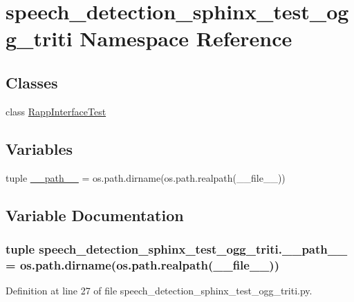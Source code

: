 \hypertarget{namespacespeech__detection__sphinx__test__ogg__triti}{\section{speech\-\_\-detection\-\_\-sphinx\-\_\-test\-\_\-ogg\-\_\-triti Namespace Reference}
\label{namespacespeech__detection__sphinx__test__ogg__triti}
}
\subsection*{Classes}
\begin{DoxyCompactItemize}
\item 
class \hyperlink{classspeech__detection__sphinx__test__ogg__triti_1_1RappInterfaceTest}{Rapp\-Interface\-Test}
\end{DoxyCompactItemize}
\subsection*{Variables}
\begin{DoxyCompactItemize}
\item 
tuple \hyperlink{namespacespeech__detection__sphinx__test__ogg__triti_a83b70617e4509ec3cfdce7b2b2aec51f}{\-\_\-\-\_\-path\-\_\-\-\_\-} = os.\-path.\-dirname(os.\-path.\-realpath(\-\_\-\-\_\-file\-\_\-\-\_\-))
\end{DoxyCompactItemize}


\subsection{Variable Documentation}
\hypertarget{namespacespeech__detection__sphinx__test__ogg__triti_a83b70617e4509ec3cfdce7b2b2aec51f}{
\subsubsection[{\-\_\-\-\_\-path\-\_\-\-\_\-}]{\setlength{\rightskip}{0pt plus 5cm}tuple speech\-\_\-detection\-\_\-sphinx\-\_\-test\-\_\-ogg\-\_\-triti.\-\_\-\-\_\-path\-\_\-\-\_\- = os.\-path.\-dirname(os.\-path.\-realpath(\-\_\-\-\_\-file\-\_\-\-\_\-))}}\label{namespacespeech__detection__sphinx__test__ogg__triti_a83b70617e4509ec3cfdce7b2b2aec51f}


Definition at line 27 of file speech\-\_\-detection\-\_\-sphinx\-\_\-test\-\_\-ogg\-\_\-triti.\-py.

